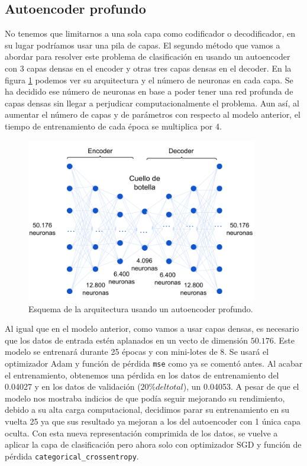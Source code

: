 \subsection{Autoencoder profundo}

No tenemos que limitarnos a una sola capa como codificador o decodificador, en su lugar podríamos usar una pila de capas. El segundo método que vamos a abordar para resolver este problema de clasificación en usando un autoencoder con 3 capas densas en el encoder y otras tres capas densas en el decoder. En la figura \ref{img: daeMMC} podemos ver su arquitectura y el número de neuronas en cada capa. Se ha decidido ese número de neuronas en base a poder tener una red profunda de capas densas sin llegar a perjudicar computacionalmente el problema. Aun así, al aumentar el número de capas y de parámetros con respecto al modelo anterior, el tiempo de entrenamiento de cada época se multiplica por 4. 

\begin{figure}[h]
    \begin{center}
    \includegraphics[width=0.9\textwidth]{img/daeMMC.png}
    \end{center}
    \caption{Esquema de la arquitectura usando un autoencoder profundo.}
    \label{img: daeMMC}
\end{figure}

Al igual que en el modelo anterior, como vamos a usar capas densas, es necesario que los datos de entrada estén aplanados en un vecto de dimensión $50.176$. Este modelo se entrenará durante 25 épocas y con mini-lotes de 8. Se usará el optimizador Adam y función de pérdida \lstinline|mse| como ya se comentó antes. Al acabar el entrenamiento, obtenemos una pérdida en los datos de entrenamiento del 0.04027 y en los datos de validación ($20\% del total$), un 0.04053. A pesar de que el modelo nos mostraba indicios de que podía seguir mejorando su rendimiento, debido a su alta carga computacional, decidimos parar su entrenamiento en su vuelta 25 ya que sus resultado ya mejoran a los del autoencoder con 1 única capa oculta. Con esta nueva representación comprimida de los datos, se vuelve a aplicar la capa de clasificación pero ahora solo con optimizador SGD y función de pérdida \lstinline|categorical_crossentropy|.



